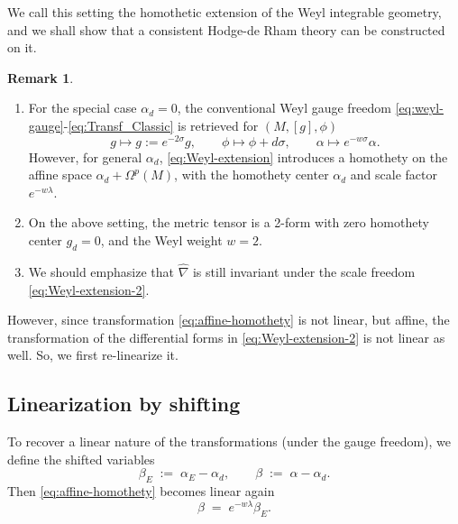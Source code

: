 \documentclass[preprint,12pt]{elsarticle}
\theoremstyle{plain}
\theoremstyle{definition}
\newtheorem{remark}[theorem]{Remark}
\theoremstyle{note}
\begin{document}
We call this setting the homothetic extension of the Weyl integrable geometry, and we shall show that a consistent Hodge-de Rham theory can be constructed on it.
\begin{remark} ~

\begin{enumerate}
\item For the special case $\alpha_d=0$, the conventional Weyl gauge freedom \eqref{eq:weyl-gauge}-\eqref{eq:Transf_Classic} is retrieved for $(M,[g],\phi)$
\begin{equation}
g \mapsto g:=e^{-2\sigma}g, \qquad \phi \mapsto \phi+d \sigma, \qquad \alpha \mapsto e^{-w\sigma}\alpha.
\end{equation}
However, for general $\alpha_d$, \eqref{eq:Weyl-extension} introduces a homothety on the affine space $\alpha_d+\Omega^p(M)$, with the homothety center $\alpha_d$ and scale factor $e^{-w\lambda}$.
\item On the above setting, the metric tensor is a 2-form with zero homothety center $g_d=0$, and the Weyl weight $w=2$.
\item We should emphasize that $\hat{\nabla}$ is still invariant under the scale freedom \eqref{eq:Weyl-extension-2}.  
\end{enumerate}

\end{remark}


However, since transformation \eqref{eq:affine-homothety} is not linear, but affine, the transformation of the differential forms in \eqref{eq:Weyl-extension-2} is not linear as well. So,  we first re-linearize it.

\subsection{Linearization by shifting}
To recover a linear nature of the transformations (under the gauge freedom), we define the shifted variables
\begin{equation}\label{eq:beta-shift}
\beta_E \;:=\; \alpha_E-\alpha_d,\qquad \beta \;:=\; \alpha-\alpha_d.
\end{equation}
Then \eqref{eq:affine-homothety} becomes linear again
\begin{equation}\label{eq:beta-linear}
\beta \;=\; e^{-w\lambda}\beta_E.
\end{equation}
\end{document}
